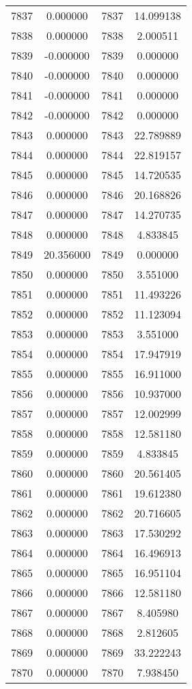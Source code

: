 \documentclass[12pt]{article}
\begin{document}
\begin{longtable}{@{}cccc@{}}
7837 & 0.000000 & 7837 & 14.099138 \\
7838 & 0.000000 & 7838 & 2.000511 \\
7839 & -0.000000 & 7839 & 0.000000 \\
7840 & -0.000000 & 7840 & 0.000000 \\
7841 & -0.000000 & 7841 & 0.000000 \\
7842 & -0.000000 & 7842 & 0.000000 \\
7843 & 0.000000 & 7843 & 22.789889 \\
7844 & 0.000000 & 7844 & 22.819157 \\
7845 & 0.000000 & 7845 & 14.720535 \\
7846 & 0.000000 & 7846 & 20.168826 \\
7847 & 0.000000 & 7847 & 14.270735 \\
7848 & 0.000000 & 7848 & 4.833845 \\
7849 & 20.356000 & 7849 & 0.000000 \\
7850 & 0.000000 & 7850 & 3.551000 \\
7851 & 0.000000 & 7851 & 11.493226 \\
7852 & 0.000000 & 7852 & 11.123094 \\
7853 & 0.000000 & 7853 & 3.551000 \\
7854 & 0.000000 & 7854 & 17.947919 \\
7855 & 0.000000 & 7855 & 16.911000 \\
7856 & 0.000000 & 7856 & 10.937000 \\
7857 & 0.000000 & 7857 & 12.002999 \\
7858 & 0.000000 & 7858 & 12.581180 \\
7859 & 0.000000 & 7859 & 4.833845 \\
7860 & 0.000000 & 7860 & 20.561405 \\
7861 & 0.000000 & 7861 & 19.612380 \\
7862 & 0.000000 & 7862 & 20.716605 \\
7863 & 0.000000 & 7863 & 17.530292 \\
7864 & 0.000000 & 7864 & 16.496913 \\
7865 & 0.000000 & 7865 & 16.951104 \\
7866 & 0.000000 & 7866 & 12.581180 \\
7867 & 0.000000 & 7867 & 8.405980 \\
7868 & 0.000000 & 7868 & 2.812605 \\
7869 & 0.000000 & 7869 & 33.222243 \\
7870 & 0.000000 & 7870 & 7.938450 \\

\end{longtable}
\end{document}
